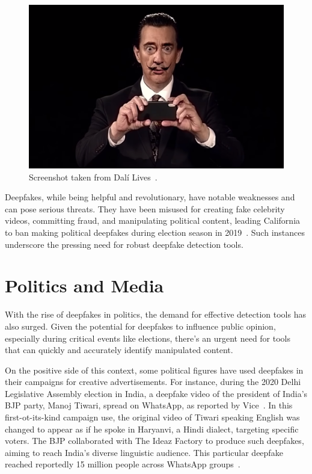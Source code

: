 \begin{figure}[ht]
	\centering
	\includegraphics[width=0.61\columnwidth]{figures/dali}
	\caption{Screenshot taken from Dalí Lives~\cite{salvador-dali-youtube}.}\label{dali-youtube}
\end{figure}

Deepfakes, while being helpful and revolutionary, have notable weaknesses and can pose serious
threats. They have been misused for creating fake celebrity videos, committing fraud, and manipulating
political content, leading California to ban making political deepfakes during election
season in 2019~\cite{salvador-dali,california}. Such instances underscore the pressing need for
robust deepfake detection tools.


\section{Politics and Media}
With the rise of deepfakes in politics, the demand for effective detection tools
has also surged. Given the potential for deepfakes to influence public opinion,
especially during critical events like elections, there's an urgent need for tools
that can quickly and accurately identify manipulated content.

On the positive side of this context,
some political figures have used deepfakes in their campaigns for creative advertisements.
For instance, during the 2020 Delhi Legislative Assembly election in India, a deepfake video
of the president of India's \ac{BJP} party, Manoj Tiwari, spread on WhatsApp, as reported
by Vice~\cite{vice}. In this first-ot-its-kind campaign use, the original video of Tiwari speaking
English was changed to appear as if he spoke in Haryanvi, a Hindi dialect, targeting specific
voters. The \ac{BJP} collaborated with The Ideaz Factory to produce such deepfakes, aiming to
reach India's diverse linguistic audience. This particular deepfake reached reportedly 15 million
people across WhatsApp groups~\cite{india}.

